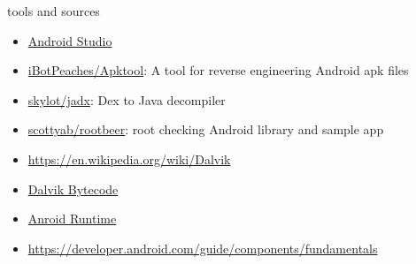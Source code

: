 \documentclass{beamer}
\begin{document}
\begin{frame}{tools and sources}

    \begin{itemize}
        \item \href{https://developer.android.com/studio}{Android Studio}
        \item \href{https://github.com/iBotPeaches/Apktool}{iBotPeaches/Apktool}:
        A tool for reverse engineering Android apk files
        \item \href{https://github.com/skylot/jadx}{skylot/jadx}: Dex to Java decompiler
        \item \href{https://github.com/scottyab/rootbeer}{scottyab/rootbeer}: root checking Android library and sample app
        \item \href{https://en.wikipedia.org/wiki/Dalvik}{https://en.wikipedia.org/wiki/Dalvik}
        \item \href{https://source.android.com/devices/tech/dalvik/dalvik-bytecode.html}{Dalvik Bytecode}
        \item \href{https://source.android.com/devices/architecture/modular-system/art}{Anroid Runtime}
        \item \href{https://developer.android.com/guide/components/fundamentals}{https://developer.android.com/guide/components/fundamentals}
    \end{itemize}
    
\end{frame}
\end{document}
